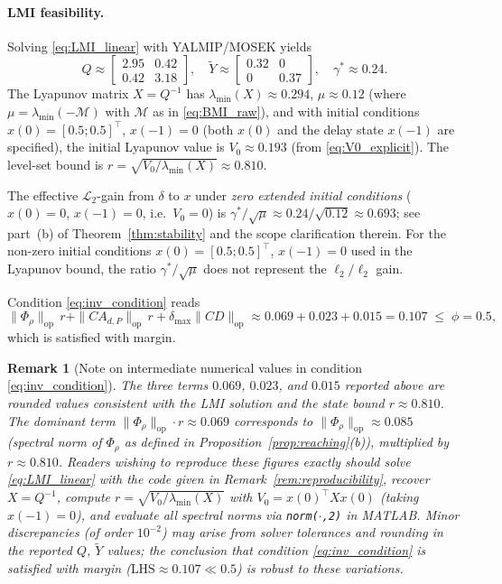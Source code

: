 \documentclass[10pt]{amsart}
\numberwithin{equation}{section}
\newtheorem{remark}[theorem]{Remark}
\begin{document}
\paragraph{LMI feasibility.}
Solving \eqref{eq:LMI_linear} with YALMIP/MOSEK yields
\[
Q \approx \begin{bmatrix} 2.95 & 0.42 \\ 0.42 & 3.18 \end{bmatrix}, \quad
\tilde{Y} \approx \begin{bmatrix} 0.32 & 0 \\ 0 & 0.37 \end{bmatrix}, \quad
\gamma^* \approx 0.24.
\]
The Lyapunov matrix $X = Q^{-1}$ has $\lambda_{\min}(X) \approx 0.294$,
$\mu \approx 0.12$ (where $\mu = \lambda_{\min}(-\mathcal{M})$ with $\mathcal{M}$ as
in \eqref{eq:BMI_raw}), and with initial conditions $x(0)=[0.5;0.5]^\top$,
$x(-1)=0$ (both $x(0)$ and the delay state $x(-1)$ are specified), the initial
Lyapunov value is $V_0 \approx 0.193$ (from \eqref{eq:V0_explicit}). The
level-set bound is $r = \sqrt{V_0/\lambda_{\min}(X)} \approx 0.810$.

The effective $\mathcal{L}_2$-gain from $\delta$ to $x$ under \emph{zero extended
initial conditions} ($x(0)=0$, $x(-1)=0$, i.e.\ $V_0=0$) is
$\gamma^*/\sqrt{\mu} \approx 0.24/\sqrt{0.12} \approx 0.693$; see part~(b) of
Theorem~\ref{thm:stability} and the scope clarification therein. For the non-zero
initial conditions $x(0)=[0.5;0.5]^\top$, $x(-1)=0$ used in the Lyapunov bound, the
ratio $\gamma^*/\sqrt{\mu}$ does not represent the $\ell_2/\ell_2$ gain.

Condition \eqref{eq:inv_condition} reads
\[
\|\Phi_\rho\|_{\mathrm{op}}\,r + \|CA_{d,P}\|_{\mathrm{op}}\,r
+ \delta_{\max}\|CD\|_{\mathrm{op}}
\approx 0.069 + 0.023 + 0.015 = 0.107 \;\leq\; \phi = 0.5,
\]
which is satisfied with margin.

\begin{remark}[Note on intermediate numerical values in condition \eqref{eq:inv_condition}]
\label{rem:num_intermediate}
The three terms $0.069$, $0.023$, and $0.015$ reported above are rounded values
consistent with the LMI solution and the state bound $r \approx 0.810$. The dominant
term $\|\Phi_\rho\|_{\mathrm{op}} \cdot r \approx 0.069$ corresponds to
$\|\Phi_\rho\|_{\mathrm{op}} \approx 0.085$ (spectral norm of $\Phi_\rho$ as defined in
Proposition~\ref{prop:reaching}(b)), multiplied by $r \approx 0.810$. Readers wishing
to reproduce these figures exactly should solve \eqref{eq:LMI_linear} with the code
given in Remark~\ref{rem:reproducibility}, recover $X = Q^{-1}$, compute
$r = \sqrt{V_0/\lambda_{\min}(X)}$ with $V_0 = x(0)^\top X x(0)$ (taking $x(-1)=0$),
and evaluate all spectral norms via \texttt{norm($\cdot$,2)} in MATLAB. Minor
discrepancies (of order $10^{-2}$) may arise from solver tolerances and rounding in the
reported $Q$, $\tilde{Y}$ values; the conclusion that condition \eqref{eq:inv_condition}
is satisfied with margin ($\text{LHS} \approx 0.107 \ll 0.5$) is robust to these
variations.
\end{remark}
\end{document}

